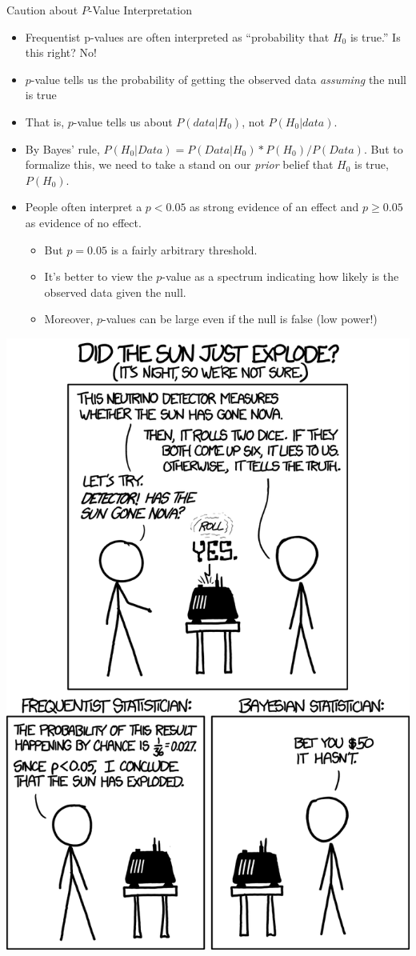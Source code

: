 \documentclass[11pt,english,handout]{beamer}
\newenvironment{wideitemize}{\itemize\addtolength{\itemsep}{10pt}}{\enditemize}
\begin{document}
\begin{frame}{Caution about $P$-Value Interpretation}

\begin{itemize}
\item Frequentist p-values are often interpreted as ``probability that $H_0$ is true.'' Is this right? \pause{} No!


\begin{wideitemize}
	\item $p$-value tells us the probability of getting the observed data \emph{assuming} the null is true
	
	\item That is, $p$-value tells us about $P(data | H_0)$, not $P(H_0 | data)$. 

	\item By Bayes' rule, $P(H_0 | Data) = P(Data | H_0) * P(H_0) / P(Data)$. But to formalize this, we need to take a stand on our \emph{prior} belief that $H_0$ is true, $P(H_0)$. 
	
\end{wideitemize}


\pause
\bigskip
\item People often interpret a $p<0.05$ as strong evidence of an effect and $p \geq 0.05$ as evidence of no effect. 

	\begin{itemize}
		\item 
		But $p=0.05$ is a fairly arbitrary threshold. 
		\vspace{0.1cm}
		\item
		It's better to view the $p$-value as a spectrum indicating how likely is the observed data given the null.  \pause
		\vspace{0.1cm}
		\item
		Moreover, $p$-values can be large even if the null is false (low power!)
	\end{itemize}
\end{itemize}

\end{frame}

\begin{frame}
	\includegraphics[width = 0.5 \linewidth]{xkcd_sun}
\end{frame}
\end{document}
